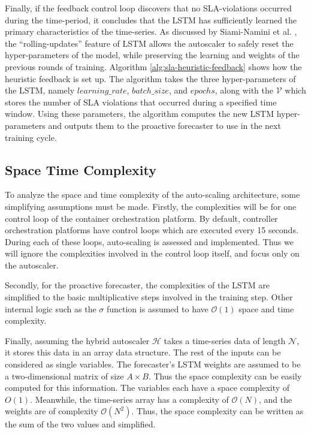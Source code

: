 Finally, if the feedback control loop discovers that no SLA-violations occurred during the time-period, it concludes that the LSTM has sufficiently learned the primary characteristics of the time-series. As discussed by Siami-Namini et al. \cite{siami2018comparison}, the ``rolling-updates'' feature of LSTM allows the autoscaler to safely reset the hyper-parameters of the model, while preserving the learning and weights of the previous rounds of training. Algorithm \ref{alg:sla-heuristic-feedback} shows how the heuristic feedback is set up. The algorithm takes the three hyper-parameters of the LSTM, namely $learning\_rate$, $batch\_size$, and $epochs$, along with the $\mathcal{V}$ which stores the number of SLA violations that occurred during a specified time window. Using these parameters, the algorithm computes the new LSTM hyper-parameters and outputs them to the proactive forecaster to use in the next training cycle.\par

\subsection{Space Time Complexity}
\label{subsec:ch3-space-time-comp}

To analyze the space and time complexity of the auto-scaling architecture, some simplifying assumptions must be made. Firstly, the complexities will be for one control loop of the container orchestration platform. By default, controller orchestration platforms have control loops which are executed every 15 seconds. During each of these loops, auto-scaling is assessed and implemented. Thus we will ignore the complexities involved in the control loop itself, and focus only on the autoscaler.\par

Secondly, for the proactive forecaster, the complexities of the LSTM are simplified to the basic multiplicative steps involved in the training step. Other internal logic such as the $\sigma$ function is assumed to have $\mathcal{O}(1)$ space and time complexity.\par

Finally, assuming the hybrid autoscaler $\mathcal{H}$ takes a time-series data of length $\mathcal{N}$, it stores this data in an array data structure. The rest of the inputs can be considered as single variables. The forecaster's LSTM weights are assumed to be a two-dimensional matrix of size $A \times B$. Thus the space complexity can be easily computed for this information. The variables each have a space complexity of $O(1)$. Meanwhile, the time-series array has a complexity of $\mathcal{O}(N)$, and the weights are of complexity $\mathcal{O}(N^2)$. Thus, the space complexity can be written as the sum of the two values and simplified.

